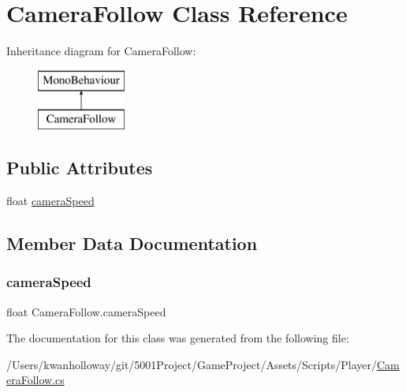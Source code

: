 \hypertarget{class_camera_follow}{}\section{Camera\+Follow Class Reference}
\label{class_camera_follow}
Inheritance diagram for Camera\+Follow\+:\begin{figure}[H]
\begin{center}
\leavevmode
\includegraphics[height=2.000000cm]{class_camera_follow}
\end{center}
\end{figure}
\subsection*{Public Attributes}
\begin{DoxyCompactItemize}
\item 
float \hyperlink{class_camera_follow_a1bc45f6500779db9197b6620308a3589}{camera\+Speed}
\end{DoxyCompactItemize}


\subsection{Member Data Documentation}
\mbox{\label{class_camera_follow_a1bc45f6500779db9197b6620308a3589}} 
\subsubsection{\texorpdfstring{camera\+Speed}{cameraSpeed}}
{\footnotesize\ttfamily float Camera\+Follow.\+camera\+Speed}



The documentation for this class was generated from the following file\+:\begin{DoxyCompactItemize}
\item 
/\+Users/kwanholloway/git/5001\+Project/\+Game\+Project/\+Assets/\+Scripts/\+Player/\hyperlink{_camera_follow_8cs}{Camera\+Follow.\+cs}\end{DoxyCompactItemize}
